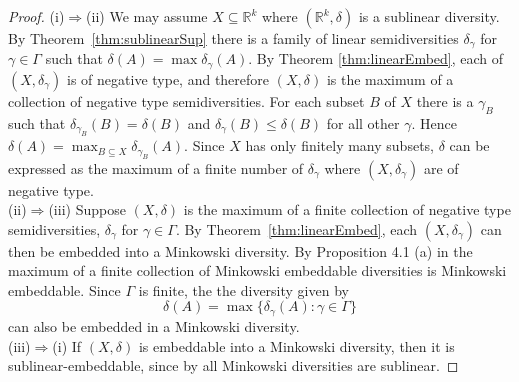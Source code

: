 \documentclass[11pt]{article}
\renewcommand{\Re}{\mathbb{R}}
\begin{document}
\begin{proof}
(i)$\Rightarrow$(ii) 
We may assume $X \subseteq \Re^k$ where $(\Re^k,\delta)$ is a sublinear diversity. By Theorem~\ref{thm:sublinearSup} there is a family of linear semidiversities $\delta_\gamma$ for $\gamma \in \Gamma$ such that $\delta(A) = \max \delta_\gamma(A)$. 
By Theorem \ref{thm:linearEmbed}, each of $(X,\delta_\gamma)$ is of negative type, and therefore $(X,\delta)$ is the maximum of a collection of negative type  semidiversities. For each subset $B$ of $X$ there is a $\gamma_B$ such that $\delta_{\gamma_B}(B)=\delta(B)$ and $\delta_{\gamma}(B) \leq \delta(B)$ for all other $\gamma$. Hence $\delta(A) = \max_{B \subseteq X} \delta_{\gamma_B} (A)$.
Since $X$ has only finitely many subsets, $\delta$ can be expressed as the maximum of a finite number of $\delta_\gamma$ where $(X,\delta_\gamma)$ are of negative type. \\
(ii)$\Rightarrow$(iii)  Suppose $(X,\delta)$ is the maximum of a finite collection of negative type semidiversities, $\delta_\gamma$ for $\gamma \in \Gamma$. 
By Theorem~\ref{thm:linearEmbed}, each $(X,\delta_\gamma)$ can then be embedded into a Minkowski diversity.  
By Proposition 4.1 (a) in \cite{bryant2023diversities} the maximum of a finite collection of Minkowski embeddable diversities is Minkowski embeddable. Since $\Gamma$ is finite, the the diversity given by 
\[\delta(A) = \max\{\delta_\gamma(A):\gamma \in \Gamma\} \]
can also be embedded in a Minkowski diversity.\\
(iii)$\Rightarrow$(i) If $(X,\delta)$ is embeddable into a Minkowski diversity, then it is sublinear-embeddable, since by  \cite[Thm.~2.4]{bryant2023diversities} all Minkowski diversities are sublinear. 
\end{proof}






\end{document}
